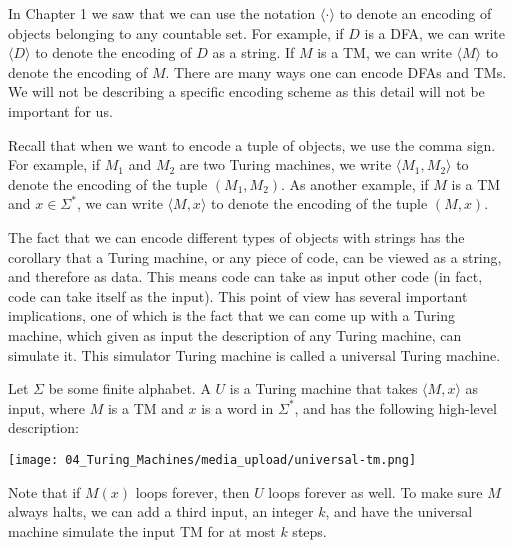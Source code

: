 \begin{note}
\label{note:Encodings-of-machines}
In Chapter 1 we saw that we can use the notation $\langle \cdot \rangle$ to denote an encoding of objects belonging to any countable set. For example, if $D$ is a DFA, we can write $\langle D \rangle$ to denote the encoding of $D$ as a string. If $M$ is a TM, we can write $\langle M \rangle$ to denote the encoding of $M$. There are many ways one can encode DFAs and TMs. We will not be describing a specific encoding scheme as this detail will not be important for us.

Recall that when we want to encode a tuple of objects, we use the comma sign. For example, if $M_1$ and $M_2$ are two Turing machines, we write $\langle M_1,M_2 \rangle$ to denote the encoding of the tuple $(M_1,M_2)$. As another example, if $M$ is a TM and $x \in \Sigma^*$, we can write $\langle M,x \rangle$ to denote the encoding of the tuple $(M,x)$. 

\end{note}

\begin{important}
\label{important:Code-is-data}
The fact that we can encode different types of objects with strings has the corollary that a Turing machine, or any piece of code, can be viewed as a string, and therefore as data. This means code can take as input other code (in fact, code can take itself as the input). This point of view has several important implications, one of which is the fact that we can come up with a Turing machine, which given as input the description of any Turing machine, can simulate it. This simulator Turing machine is called a universal Turing machine.

\end{important}

\begin{definition}
\label{definition:Universal-Turing-machine}
Let $\Sigma$ be some finite alphabet. A  $U$ is a Turing machine that takes $\langle M,x \rangle$ as input, where $M$ is a TM and $x$ is a word in $\Sigma^*$, and has the following high-level description:
\begin{center}
    \texttt{[image: 04\_Turing\_Machines/media\_upload/universal-tm.png]}
\end{center}
Note that if $M(x)$ loops forever, then $U$ loops forever as well. To make sure $M$ always halts, we can add a third input, an integer $k$, and have the universal machine simulate the input TM for at most $k$ steps.

\end{definition}

